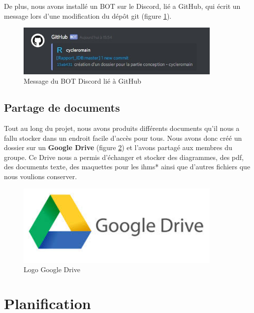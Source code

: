 De plus, nous avons installé un BOT sur le Discord, lié a GitHub, qui écrit un message lors d'une modification du dép\^ot git (figure \ref{bot_discord}).

\begin{figure}[!h]
\centering
\includegraphics[width=10cm]{./images/activite/bot_discord.jpg}
\caption{Message du BOT Discord lié à GitHub}
\label{bot_discord}
\end{figure}



\subsection{Partage de documents}
Tout au long du projet, nous avons produits différents documents qu'il nous a fallu stocker dans un endroit facile d'accès pour tous. Nous avons donc créé un dossier sur un \textbf{Google Drive} (figure \ref{googledrive_logo}) et l'avons partagé aux membres du groupe. Ce Drive nous a permis d'échanger et stocker des diagrammes, des pdf, des documents texte, des maquettes pour les \glspl{ihm}* ainsi que d'autres fichiers que nous voulions conserver.

\begin{figure}[!h]
\centering
\includegraphics[width=10cm]{./images/activite/googleDriveLogo.jpg}
\caption{Logo Google Drive}
\label{googledrive_logo}
\end{figure}



\section{Planification}